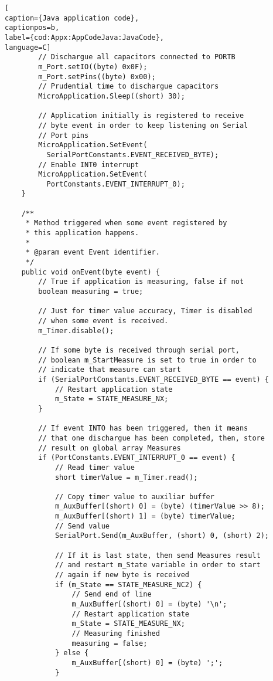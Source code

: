 \begin{lstlisting}[
caption={Java application code},
captionpos=b,
label={cod:Appx:AppCodeJava:JavaCode},
language=C]
        // Dischargue all capacitors connected to PORTB
        m_Port.setIO((byte) 0x0F);
        m_Port.setPins((byte) 0x00);
        // Prudential time to dischargue capacitors
        MicroApplication.Sleep((short) 30);

        // Application initially is registered to receive
        // byte event in order to keep listening on Serial
        // Port pins
        MicroApplication.SetEvent(
          SerialPortConstants.EVENT_RECEIVED_BYTE);
        // Enable INT0 interrupt
        MicroApplication.SetEvent(
          PortConstants.EVENT_INTERRUPT_0);
    }

    /**
     * Method triggered when some event registered by
     * this application happens.
     *
     * @param event Event identifier.
     */
    public void onEvent(byte event) {
        // True if application is measuring, false if not
        boolean measuring = true;

        // Just for timer value accuracy, Timer is disabled
        // when some event is received.
        m_Timer.disable();

        // If some byte is received through serial port,
        // boolean m_StartMeasure is set to true in order to
        // indicate that measure can start
        if (SerialPortConstants.EVENT_RECEIVED_BYTE == event) {
            // Restart application state
            m_State = STATE_MEASURE_NX;
        }

        // If event INTO has been triggered, then it means
        // that one dischargue has been completed, then, store
        // result on global array Measures
        if (PortConstants.EVENT_INTERRUPT_0 == event) {
            // Read timer value
            short timerValue = m_Timer.read();

            // Copy timer value to auxiliar buffer
            m_AuxBuffer[(short) 0] = (byte) (timerValue >> 8);
            m_AuxBuffer[(short) 1] = (byte) timerValue;
            // Send value
            SerialPort.Send(m_AuxBuffer, (short) 0, (short) 2);

            // If it is last state, then send Measures result
            // and restart m_State variable in order to start
            // again if new byte is received
            if (m_State == STATE_MEASURE_NC2) {
                // Send end of line
                m_AuxBuffer[(short) 0] = (byte) '\n';
                // Restart application state
                m_State = STATE_MEASURE_NX;
                // Measuring finished
                measuring = false;
            } else {
                m_AuxBuffer[(short) 0] = (byte) ';';
            }
            

\end{lstlisting}
